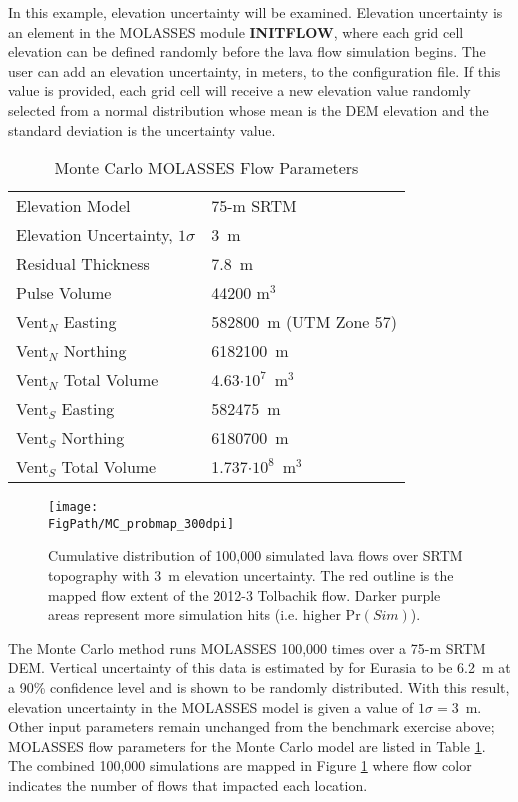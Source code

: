 		In this example, elevation uncertainty will be examined. Elevation uncertainty is an element in the MOLASSES module \textbf{INITFLOW}, where each grid cell elevation can be defined randomly before the lava flow simulation begins. The user can add an elevation uncertainty, in meters, to the configuration file. If this value is provided, each grid cell will receive a new elevation value randomly selected from a normal distribution whose mean is the DEM elevation and the standard deviation is the uncertainty value.
		
		\begin{table}[h!]
		\centering
			\caption{Monte Carlo MOLASSES Flow Parameters}
			\begin{tabular}{l l}
				\toprule
				Elevation Model & 75-m SRTM\\
				Elevation Uncertainty, $1\sigma$ & 3~m\\
				Residual Thickness & 7.8~m\\
				Pulse Volume & 44200 m$^3$\\
				\midrule
				Vent$_N$ Easting & 582800~m (UTM Zone 57)\\
				Vent$_N$ Northing & 6182100~m\\
				Vent$_N$ Total Volume & 4.63$\cdot10^7$~m$^3$\\
				\midrule
				Vent$_S$ Easting & 582475~m\\
				Vent$_S$ Northing & 6180700~m\\
				Vent$_S$ Total Volume & 1.737$\cdot10^8$~m$^3$\\
				\bottomrule
			\end{tabular}
			\label{tab_parameters_MC}
		\end{table}
		
		\begin{figure}
			\centering
			\texttt{[image: \\FigPath/MC\_probmap\_300dpi]}
			\caption[Map of Monte Carlo simulations of the 2012-3 Tolbachik lava flows]{Cumulative distribution of 100,000 simulated lava flows over SRTM topography with 3~m elevation uncertainty. The red outline is the mapped flow extent of the 2012-3 Tolbachik flow. Darker purple areas represent more simulation hits (i.e. higher $\text{Pr}(Sim)$).}
			\label{fig_MC_map}
		\end{figure}
		
		The Monte Carlo method runs MOLASSES 100,000 times over a 75-m SRTM DEM. Vertical uncertainty of this data is estimated by \citet{rodriguez2006global} for Eurasia to be 6.2~m at a 90\% confidence level and is shown to be randomly distributed. With this result, elevation uncertainty in the MOLASSES model is given a value of $1\sigma=3$~m. Other input parameters remain unchanged from the benchmark exercise above; MOLASSES flow parameters for the Monte Carlo model are listed in Table \ref{tab_parameters_MC}. The combined 100,000 simulations are mapped in Figure \ref{fig_MC_map} where flow color indicates the number of flows that impacted each location.
		

